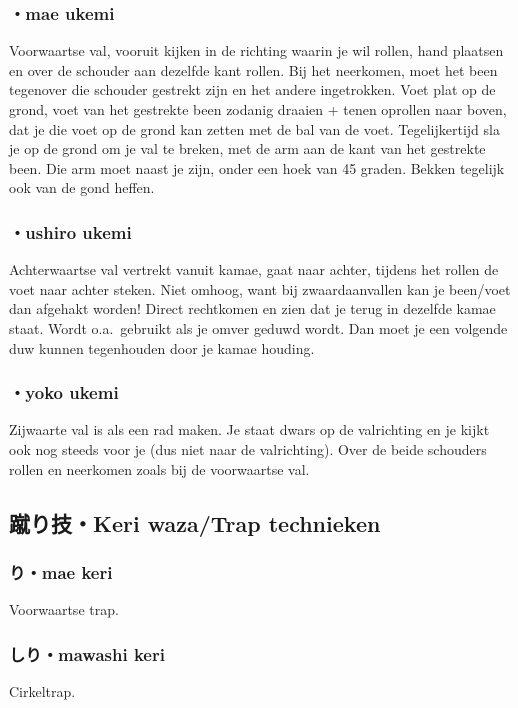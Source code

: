 \subsubsection{・mae ukemi}
Voorwaartse val, vooruit kijken in de richting waarin je wil rollen, hand plaatsen en over de schouder aan dezelfde kant rollen. Bij het neerkomen, moet het been tegenover die schouder gestrekt zijn en het andere ingetrokken. Voet plat op de grond, voet van het gestrekte been zodanig draaien + tenen oprollen naar boven, dat je die voet op de grond kan zetten met de bal van de voet. Tegelijkertijd sla je op de grond om je val te breken, met de arm aan de kant van het gestrekte been. Die arm moet naast je zijn, onder een hoek van 45 graden. Bekken tegelijk ook van de gond heffen.

\subsubsection{・ushiro ukemi}
Achterwaartse val vertrekt vanuit kamae, gaat naar achter, tijdens het rollen de voet naar achter steken. Niet omhoog, want bij zwaardaanvallen kan je been/voet dan afgehakt worden! Direct rechtkomen en zien dat je terug in dezelfde kamae staat. Wordt o.a.\ gebruikt als je omver geduwd wordt. Dan moet je een volgende duw kunnen tegenhouden door je kamae houding.

\subsubsection{・yoko ukemi}
Zijwaarte val is als een rad maken. Je staat dwars op de valrichting en je kijkt ook nog steeds voor je (dus niet naar de valrichting). Over de beide schouders rollen en neerkomen zoals bij de voorwaartse val.

\subsection{蹴り技・Keri waza/Trap technieken}
\subsubsection{り・mae keri}
Voorwaartse trap.

\subsubsection{しり・mawashi keri}
Cirkeltrap.

